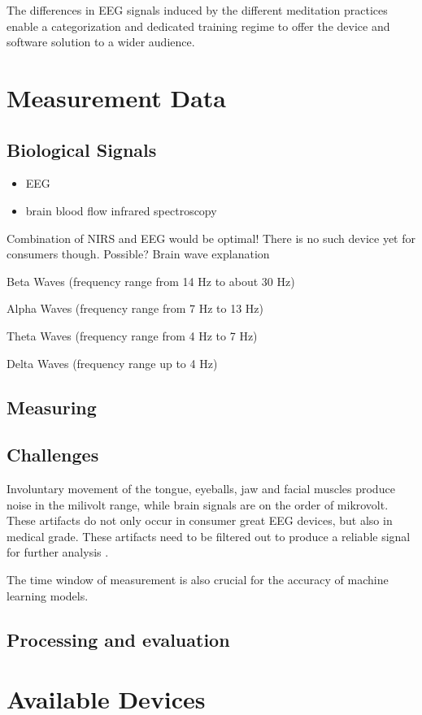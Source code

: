 \documentclass{llncs} %
\begin{document}
The differences in EEG signals induced by the different meditation practices enable a categorization
and dedicated training regime to offer the device and software solution to a wider audience. \cite{Travis}
\section{Measurement Data}
\subsection{Biological Signals}
\begin{itemize}
    \item EEG
    \item brain blood flow infrared spectroscopy
\end{itemize}
Combination of NIRS and EEG would be optimal! There is no such device yet for consumers though.
Possible?
Brain wave explanation



Beta Waves (frequency range from 14 Hz to about 30 Hz)


Alpha Waves (frequency range from 7 Hz to 13 Hz)


Theta Waves (frequency range from 4 Hz to 7 Hz)


Delta Waves (frequency range up to 4 Hz)
\subsection{Measuring}
\subsection{Challenges}
Involuntary movement of the tongue, eyeballs, jaw and facial muscles produce noise in the milivolt range, while brain signals are on 
the order of mikrovolt. These artifacts do not only occur in consumer great EEG devices, but also in medical grade.
These artifacts need to be filtered out to produce a reliable signal for further analysis \cite{Bashivan: et al}.

The time window of measurement is also crucial for the accuracy of machine learning models.
\subsection{Processing and evaluation}
\section{Available Devices}
\end{document}
